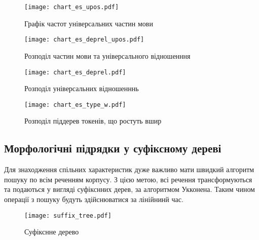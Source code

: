 \begin{multicols}{2}
\begin{figure}[H]
  \begin{center}
    \texttt{[image: chart\_es\_upos.pdf]}
  \end{center}
  \caption{Графік частот універсальних частин мови}
  \label{img:es_upos}
\end{figure}

\begin{figure}[H]
  \begin{center}
    \texttt{[image: chart\_es\_deprel\_upos.pdf]}
  \end{center}
  \caption{Розподіл частин мови та універсального відношенння}
  \label{img:es_deprel_upos}
\end{figure}

\begin{figure}[H]
  \begin{center}
    \texttt{[image: chart\_es\_deprel.pdf]}
  \end{center}
  \caption{Розподіл універсальних відношенннь}
  \label{img:es0}
\end{figure}

\begin{figure}[H]
  \begin{center}
    \texttt{[image: chart\_es\_type\_w.pdf]}
  \end{center}
  \caption{Розподіл піддерев токенів, що ростуть вшир}
  \label{img:es3}
\end{figure}

\end{multicols}

\newpage
\subsection{Морфологічні підрядки у суфіксному дереві}
Для знаходження спільних характеристик дуже важливо мати
швидкий алгоритм пошуку по всім реченням корпусу. З цією метою,
всі речення трансформуються та подаються у вигляді суфікснних дерев, за 
алгоритмом Укконена. Таким чином операції з пошуку будуть здійснюватися за лінійнинй час.

\begin{figure}[ht]
  \begin{center}
    \texttt{[image: suffix\_tree.pdf]}
  \end{center}
  \caption{Суфікснне дерево}
  \label{img:suffix_tree}
\end{figure}

